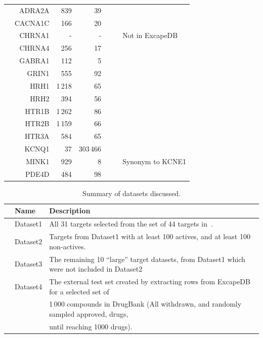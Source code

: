 \documentclass[utf8]{frontiersSCNS} %
\begin{document}
\begin{table}[p]
\begin{tabular}{crrrrcl}
&    ADRA2A  &       839     &       39          &            &       &       \\
&    CACNA1C &       166     &       20          &            &       &       \\
&    CHRNA1  &       -       &       -           &            &       & Not in ExcapeDB \\
&    CHRNA4  &       256     &       17          &            &       &       \\
&    GABRA1  &       112     &       5           &            &       &       \\
&    GRIN1   &       555     &       92          &            &       &       \\
&    HRH1    &       1\,218  &       65          &            &       &       \\
&    HRH2    &       394     &       56          &            &       &       \\
&    HTR1B   &       1\,262  &       86          &            &       &       \\
&    HTR2B   &       1\,159  &       66          &            &       &       \\
&    HTR3A   &       584     &       65          &            &       &       \\
&    KCNQ1   &       37      &       303\,466    &            &       &       \\
&    MINK1   &       929     &       8           &            &       & Synonym to KCNE1 \\
&    PDE4D   &       484     &       98          &            &       &       \\

\bottomrule
\end{tabular}
\end{table}

\begin{table}[p]
\small
\centering
\caption{Summary of datasets discussed.}
\label{tbl:datasets}
\begin{tabular}{rll}
\toprule
& Name     & Description \\
\midrule
& Dataset1 & All 31 targets selected from the set of 44 targets in~\cite{Bowes2012}. \\
& Dataset2 & Targets from Dataset1 with at least 100 actives, and at least 100 non-actives. \\
& Dataset3 & The remaining 10 ``large'' target datasets, from Dataset1 which were not included in Dataset2 \\
& Dataset4 & The external test set created by extracting rows from ExcapeDB for a selected set of \\
&          & 1\,000 compounds in DrugBank (All withdrawn, and randomly sampled approved, drugs,\\
&          & until reaching 1000 drugs). \\
\bottomrule
\end{tabular}
\end{table}
\end{document}
